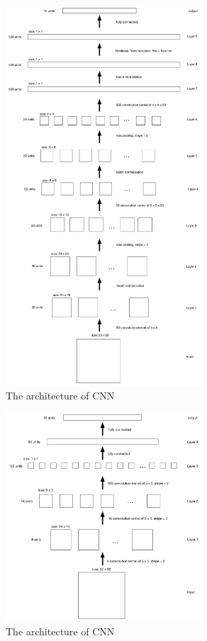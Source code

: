 \documentclass[12pt]{article}
\begin{document}
\begin{figure}[tbp]
	\centering
	\includegraphics[width =0.65\textwidth]{cnn_arch}		
	\caption{The architecture of CNN}
	\label{fig:arch}
\end{figure}

\begin{figure}[tbp]
	\centering
	\includegraphics[width = 0.65\textwidth]{cnn}		
	\caption{The architecture of CNN}
	\label{fig:arch}
\end{figure}
\end{document}
